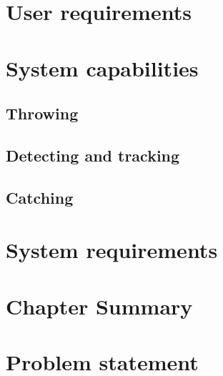\section{User requirements}
\label{sec:User requirements}

\section{System capabilities}
\label{sec:System capabilities}

\subsection{Throwing}
\label{sec:ThrowingAnalysis}

\subsection{Detecting and tracking}
\label{sec:Detecting and trackingAnalysis}

\subsection{Catching}
\label{sec:CatchingAnalysis}

\section{System requirements}
\label{sec:System requirements}

\section{Chapter Summary}
\label{sec:Chapter Summary}

\section{Problem statement}
\label{sec:Problem statement}